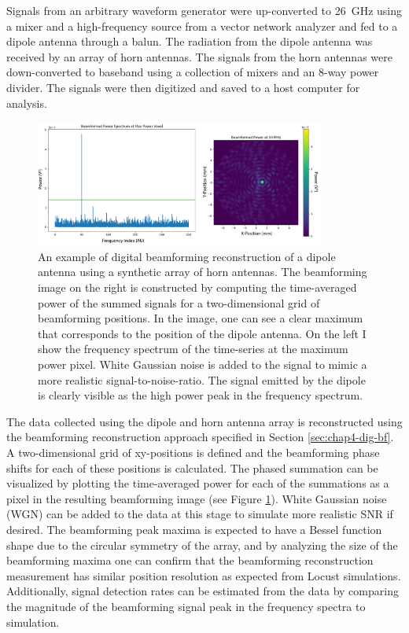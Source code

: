 Signals from an arbitrary waveform generator were up-converted to 26~GHz using a mixer and a high-frequency source from a vector network analyzer and fed to a dipole antenna through a balun. The radiation from the dipole antenna was received by an array of horn antennas. The signals from the horn antennas were down-converted to baseband using a collection of mixers and an 8-way power divider. The signals were then digitized and saved to a host computer for analysis.

\begin{figure}
    \centering
    \includegraphics*[width=0.85\textwidth]{figs/Chapter-4/230725_beamforming_example.png}
    \caption{\label{fig:chap4-beamforming-demo-example}An example of digital beamforming reconstruction of a dipole antenna using a synthetic array of horn antennas. The beamforming image on the right is constructed by computing the time-averaged power of the summed signals for a two-dimensional grid of beamforming positions. In the image, one can see a clear maximum that corresponds to the position of the dipole antenna. On the left I show the frequency spectrum of the time-series at the maximum power pixel. White Gaussian noise is added to the signal to mimic a more realistic signal-to-noise-ratio. The signal emitted by the dipole is clearly visible as the high power peak in the frequency spectrum.}
\end{figure}

The data collected using the dipole and horn antenna array is reconstructed using the beamforming reconstruction approach specified in Section \ref{sec:chap4-dig-bf}. A two-dimensional grid of xy-positions is defined and the beamforming phase shifts for each of these positions is calculated. The phased summation can be visualized by plotting the time-averaged power for each of the summations as a pixel in the resulting beamforming image (see Figure \ref{fig:chap4-beamforming-demo-example}). White Gaussian noise (WGN) can be added to the data at this stage to simulate more realistic SNR if desired. The beamforming peak maxima is expected to have a Bessel function shape due to the circular symmetry of the array, and by analyzing the size of the beamforming maxima one can confirm that the beamforming reconstruction measurement has similar position resolution as expected from Locust simulations. Additionally, signal detection rates can be estimated from the data by comparing the magnitude of the beamforming signal peak in the frequency spectra to simulation.


